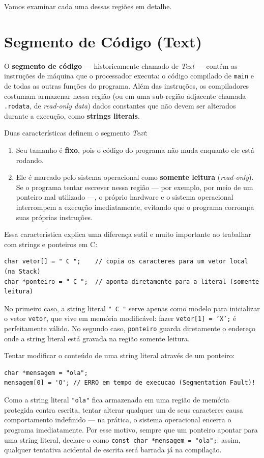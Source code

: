 Vamos examinar cada uma dessas regiões em detalhe.

\section{Segmento de Código (Text)}
\label{sec:segmento-text}

O \textbf{segmento de código} — historicamente chamado de \textit{Text} — contém as instruções de máquina que o processador executa: o código compilado de \texttt{main} e de todas as outras funções do programa. Além das instruções, os compiladores costumam armazenar nessa região (ou em uma sub-região adjacente chamada \texttt{.rodata}, de \textit{read-only data}) dados constantes que não devem ser alterados durante a execução, como \textbf{strings literais}.

Duas características definem o segmento \textit{Text}:

\begin{enumerate}
    \item Seu tamanho é \textbf{fixo}, pois o código do programa não muda enquanto ele está rodando.
    \item Ele é marcado pelo sistema operacional como \textbf{somente leitura} (\textit{read-only}). Se o programa tentar escrever nessa região — por exemplo, por meio de um ponteiro mal utilizado —, o próprio hardware e o sistema operacional interrompem a execução imediatamente, evitando que o programa corrompa suas próprias instruções.
\end{enumerate}

Essa característica explica uma diferença sutil e muito importante ao trabalhar com strings e ponteiros em C:

\begin{lstlisting}
char vetor[] = " C ";    // copia os caracteres para um vetor local (na Stack)
char *ponteiro = " C ";  // aponta diretamente para a literal (somente leitura)
\end{lstlisting}

No primeiro caso, a string literal \texttt{" C "} serve apenas como modelo para inicializar o vetor \texttt{vetor}, que vive em memória modificável: fazer \texttt{vetor[1] = 'X';} é perfeitamente válido. No segundo caso, \texttt{ponteiro} guarda diretamente o endereço onde a string literal está gravada na região somente leitura.

\begin{errocomum}
Tentar modificar o conteúdo de uma string literal através de um ponteiro:
\begin{lstlisting}
char *mensagem = "ola";
mensagem[0] = 'O'; // ERRO em tempo de execucao (Segmentation Fault)!
\end{lstlisting}
Como a string literal \texttt{"ola"} fica armazenada em uma região de memória protegida contra escrita, tentar alterar qualquer um de seus caracteres causa comportamento indefinido — na prática, o sistema operacional encerra o programa imediatamente. Por esse motivo, sempre que um ponteiro apontar para uma string literal, declare-o como \texttt{const char *mensagem = "ola";}: assim, qualquer tentativa acidental de escrita será barrada já na compilação.
\end{errocomum}

